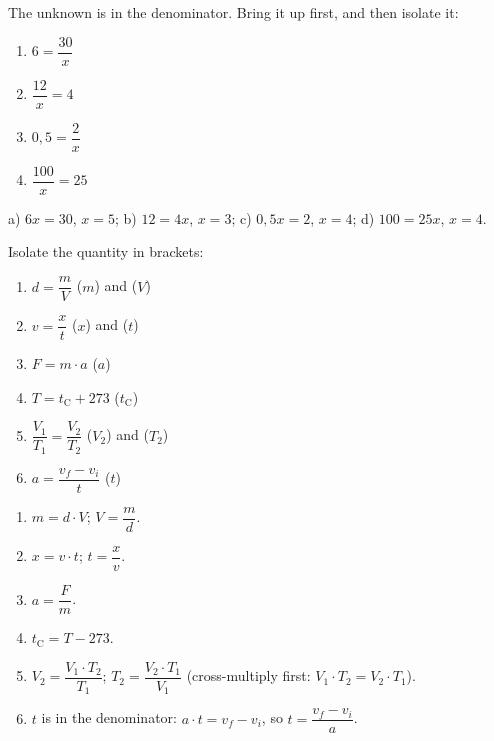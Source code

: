 \begin{exercise}
    The unknown is in the denominator. Bring it up first, and then isolate it:
    \begin{enumerate}[label=\letraminuscula]
        \item \(6 = \dfrac{30}{x}\)
        \item \(\dfrac{12}{x} = 4\)
        \item \(0{,}5 = \dfrac{2}{x}\)
        \item \(\dfrac{100}{x} = 25\)
    \end{enumerate}
    \begin{solu}
        a) \(6x = 30\), \(x = 5\); b) \(12 = 4x\), \(x = 3\); c) \(0{,}5x = 2\), \(x = 4\); d) \(100 = 25x\), \(x = 4\).
    \end{solu}
\end{exercise}

\begin{exercise}
    Isolate the quantity in brackets:
    \begin{enumerate}[label=\letraminuscula]
        \item \(d = \dfrac{m}{V}\) \quad (\(m\)) and (\(V\))
        \item \(v = \dfrac{x}{t}\) \quad (\(x\)) and (\(t\))
        \item \(F = m \cdot a\) \quad (\(a\))
        \item \(T = t_{\text{C}} + 273\) \quad (\(t_{\text{C}}\))
        \item \(\dfrac{V_1}{T_1} = \dfrac{V_2}{T_2}\) \quad (\(V_2\)) and (\(T_2\))
        \item \(a = \dfrac{v_f - v_i}{t}\) \quad (\(t\))
    \end{enumerate}
    \begin{solu}
        \begin{enumerate}[label=\alph*)]
            \item \(m = d \cdot V\); \(V = \dfrac{m}{d}\).
            \item \(x = v \cdot t\); \(t = \dfrac{x}{v}\).
            \item \(a = \dfrac{F}{m}\).
            \item \(t_{\text{C}} = T - 273\).
            \item \(V_2 = \dfrac{V_1 \cdot T_2}{T_1}\); \(T_2 = \dfrac{V_2 \cdot T_1}{V_1}\) (cross-multiply first: \(V_1 \cdot T_2 = V_2 \cdot T_1\)).
            \item \(t\) is in the denominator: \(a \cdot t = v_f - v_i\), so \(t = \dfrac{v_f - v_i}{a}\).
        \end{enumerate}
    \end{solu}
\end{exercise}

